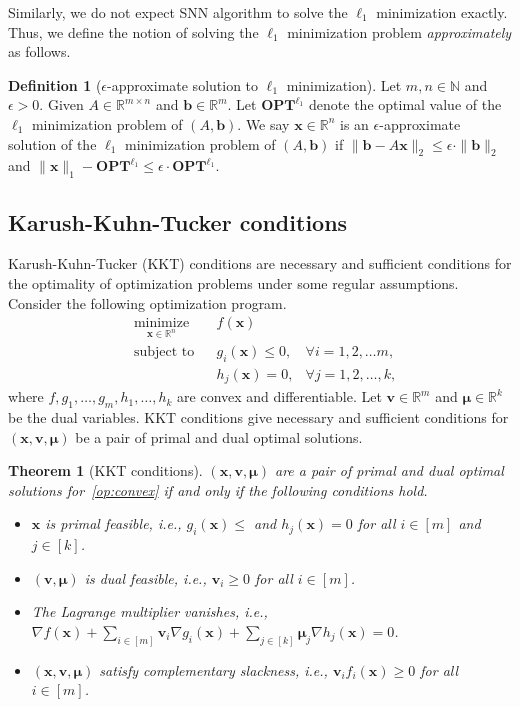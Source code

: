 \documentclass[11pt]{article}
\newtheorem{theorem}{Theorem}
\theoremstyle{remark}
\theoremstyle{definition}
\newtheorem{definition}{Definition}
\newcommand{\bx}{\mathbf{x}}
\newcommand{\bb}{\mathbf{b}}
\newcommand{\bv}{\mathbf{v}}
\newcommand{\bmu}{\boldsymbol{\mu}}
\newcommand{\OPT}{\mathbf{OPT}}
\newcommand{\R}{{\mathbb R}} %
\newcommand{\N}{{\mathbb{N}}} %
\begin{document}
Similarly, we do not expect SNN algorithm to solve the $\ell_1$ minimization exactly. Thus, we define the notion of solving the $\ell_1$ minimization problem \textit{approximately} as follows.

\begin{definition}[$\epsilon$-approximate solution to $\ell_1$ minimization]\label{def:l1 min eps approx sol}
	Let $m,n\in\N$ and $\epsilon>0$. Given $A\in\R^{m\times n}$ and $\bb\in\R^m$. Let $\OPT^{\ell_1}$ denote the optimal value of the $\ell_1$ minimization problem of $(A,\bb)$. We say $\bx\in\R^n$ is an $\epsilon$-approximate solution of the $\ell_1$ minimization problem of $(A,\bb)$ if $\|\bb-A\bx\|_2\leq\epsilon\cdot\|\bb\|_2$ and $\|\bx\|_1-\OPT^{\ell_1}\leq\epsilon\cdot\OPT^{\ell_1}$.
\end{definition}


\subsection{Karush-Kuhn-Tucker conditions}\label{sec:KKT}
Karush-Kuhn-Tucker (KKT) conditions are necessary and sufficient conditions for the optimality of optimization problems under some regular assumptions. Consider the following optimization program.
\begin{equation}\label{op:convex}
\begin{aligned}
& \underset{\bx\in\R^n}{\text{minimize}}
& & f(\bx) \\
& \text{subject to}
& & g_i(\bx)\leq0,&\forall i=1,2,\dots m,\\
& & & h_j(\bx)=0,&\forall j=1,2,\dots,k,
\end{aligned}
\end{equation}
where $f,g_1,\dots,g_m,h_1,\dots,h_k$ are convex and differentiable. Let $\bv\in\R^m$ and $\bmu\in\R^k$ be the dual variables. KKT conditions give necessary and sufficient conditions for $(\bx,\bv,\bmu)$ be a pair of primal and dual optimal solutions.

\begin{theorem}[KKT conditions]\label{thm:KKT}
	$(\bx,\bv,\bmu)$ are a pair of primal and dual optimal solutions for~\eqref{op:convex} if and only if the following conditions hold.
	\begin{itemize}
		\item $\bx$ is primal feasible, \textit{i.e.,} $g_i(\bx)\leq$ and $h_j(\bx)=0$ for all $i\in[m]$ and $j\in[k]$.
		\item $(\bv,\bmu)$ is dual feasible, \textit{i.e.,} $\bv_i\geq0$ for all $i\in[m]$.
		\item The Lagrange multiplier vanishes, \textit{i.e.,} $\nabla f(\bx) + \sum_{i\in[m]}\bv_i\nabla g_i(\bx) + \sum_{j\in[k]}\bmu_j\nabla h_j(\bx)=0$.
		\item $(\bx,\bv,\bmu)$ satisfy complementary slackness, \textit{i.e.,} $\bv_i f_i(\bx)\geq0$ for all $i\in[m]$.
	\end{itemize}
\end{theorem}
\end{document}
